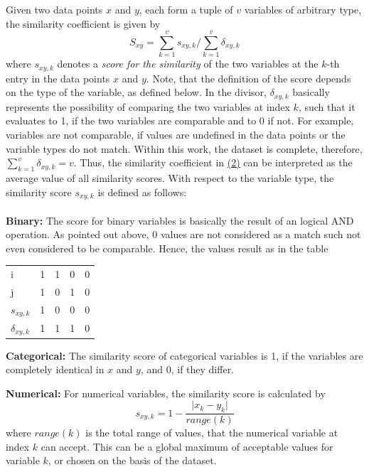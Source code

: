 	Given two data points $x$ and $y$, each form a tuple of $v$ variables of arbitrary type, the similarity coefficient is given by
	\begin{equation}\label{eq1}
	S_{xy} = \sum_{k=1}^{v} s_{xy,k} / \sum_{k=1}^{v} \delta_{xy,k} 
	\end{equation} 
	where $s_{xy,k}$ denotes a \textit{score for the similarity} of the two variables at the $k$-th entry in the data points $x$ and $y$. Note, that the definition of the score depends on the
	type of the variable, as defined below. In the divisor, $\delta_{xy,k}$ basically represents the possibility of comparing the two variables at index $k$, such that it evaluates to 1, if the two variables are comparable and to 0 if not. %
	For example, variables are not comparable, if values are undefined in the data points or the variable types do not match. Within this work, the dataset is complete, therefore, $\sum_{k=1}^{v} \delta_{xy,k}=v$. Thus, the similarity coefficient in \hyperref[eq1]{(2)} can be interpreted as the average value of all similarity scores. 
	With respect to the variable type, the similarity score $s_{xy,k}$ is defined as follows:\\
	\\ \textbf{Binary:} The score for binary variables is basically the result of an logical AND operation. As pointed out above, 0 values are not considered as a match such not even considered to be comparable. Hence, the values result as in the table
		\begin{center}
			\begin{tabular}{l | c c c r}
				i & 1 & 1 & 0 & 0 \\
				j & 1 & 0 & 1 & 0 \\
				\hline
				$s_{xy,k}$ & 1 & 0 & 0 & 0 \\
				$\delta_{xy,k}$ & 1 & 1 & 1 & 0
			\end{tabular}
		\end{center}	
	\textbf{Categorical:} The similarity score of categorical variables is 1, if the variables are completely identical in $x$ and $y$, and 0, if they differ.
	
	\textbf{Numerical:} For numerical variables, the similarity score is calculated by
		\begin{equation*}
		s_{xy,k} = 1 - \frac{\vert x_k - y_k \vert}{range(k)}
		\end{equation*}
		where $range(k)$ is the total range of values, that the numerical variable at index $k$ can accept. This can be a global maximum of acceptable values for variable $k$, or chosen on the basis of the dataset.

